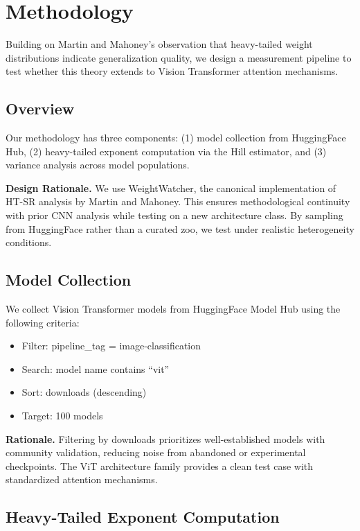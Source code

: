 \section{Methodology}
\label{sec:methodology}

Building on Martin and Mahoney's observation that heavy-tailed weight distributions indicate generalization quality, we design a measurement pipeline to test whether this theory extends to Vision Transformer attention mechanisms.

\subsection{Overview}

Our methodology has three components: (1) model collection from HuggingFace Hub, (2) heavy-tailed exponent computation via the Hill estimator, and (3) variance analysis across model populations.

\textbf{Design Rationale.} We use WeightWatcher, the canonical implementation of HT-SR analysis by Martin and Mahoney. This ensures methodological continuity with prior CNN analysis while testing on a new architecture class. By sampling from HuggingFace rather than a curated zoo, we test under realistic heterogeneity conditions.

\subsection{Model Collection}

We collect Vision Transformer models from HuggingFace Model Hub using the following criteria:

\begin{itemize}
    \item Filter: pipeline\_tag = image-classification
    \item Search: model name contains ``vit''
    \item Sort: downloads (descending)
    \item Target: 100 models
\end{itemize}

\textbf{Rationale.} Filtering by downloads prioritizes well-established models with community validation, reducing noise from abandoned or experimental checkpoints. The ViT architecture family provides a clean test case with standardized attention mechanisms.

\subsection{Heavy-Tailed Exponent Computation}

